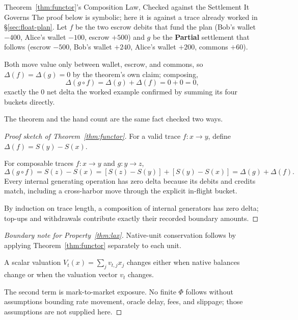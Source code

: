 \documentclass[11pt,a4paper]{article}
\theoremstyle{definition}
\theoremstyle{definition}
\theoremstyle{remark}
\begin{document}
\begin{pdexample}{Theorem~\ref{thm:functor}'s Composition Law, Checked against the Settlement It Governs}
\setlength{\parskip}{4pt plus 1pt}
The proof below is symbolic; here it is against a trace already worked in
\S\ref{sec:float-plan}. Let $f$ be the two escrow debits that fund the plan
(Bob's wallet $-400$, Alice's wallet $-100$, escrow $+500$) and $g$ be the
\textbf{Partial} settlement that follows (escrow $-500$, Bob's wallet $+240$,
Alice's wallet $+200$, commons $+60$).

Both move value only between wallet,
escrow, and commons, so $\Delta(f)=\Delta(g)=0$ by the theorem's own claim;
composing, \[
\Delta(g\circ f)=\Delta(g)+\Delta(f)=0+0=0,
\] exactly the $0$ net
delta the worked example confirmed by summing its four buckets directly.

The
theorem and the hand count are the same fact checked two ways.
\end{pdexample}

\begin{proof}[Proof sketch of Theorem~\ref{thm:functor}]
\setlength{\parskip}{4pt plus 1pt}
For a valid trace $f:x\to y$, define $\Delta(f)=S(y)-S(x)$.

For composable traces
$f:x\to y$ and $g:y\to z$,
\[
\Delta(g\circ f)=S(z)-S(x)=[S(z)-S(y)]+[S(y)-S(x)]
=\Delta(g)+\Delta(f).
\]
Every internal generating operation has zero delta because its debits and credits
match, including a cross-harbor move through the explicit in-flight bucket.

By
induction on trace length, a composition of internal generators has zero delta;
top-ups and withdrawals contribute exactly their recorded boundary amounts.
\end{proof}

\begin{proof}[Boundary note for Property~\ref{thm:lax}]
\setlength{\parskip}{4pt plus 1pt}
Native-unit conservation follows by applying Theorem~\ref{thm:functor} separately
to each unit.

A scalar valuation $V_t(x)=\sum_j v_{t,j}x_j$ changes either when
native balances change or when the valuation vector $v_t$ changes.

The second term
is mark-to-market exposure. No finite $\Phi$ follows without assumptions bounding
rate movement, oracle delay, fees, and slippage; those assumptions are not supplied
here.
\end{proof}
\end{document}
